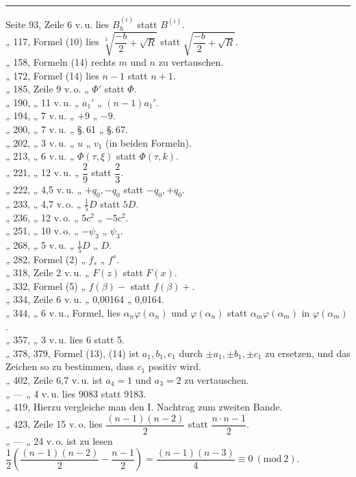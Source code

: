 \begin{center}
\textbf{}
\end{center}

\begin{center}
\rule{4cm}{0.4pt}
\end{center}

\begin{flushleft}
Seite 93, Zeile 6 v.\,u. lies $B_h^{(i)}$ statt $B^{(i)}$. \\
„ 117, Formel (10) lies $\sqrt[3]{\dfrac{-b}{2}+\sqrt{R}}$ statt $\sqrt{\dfrac{-b}{2}+\sqrt{R}}$. \\
„ 158, Formeln (14) rechts $m$ und $n$ zu vertauschen. \\
„ 172, Formel (14) lies $n-1$ statt $n+1$. \\
„ 185, Zeile 9 v.\,o. „ $\Phi'$ statt $\Phi$. \\
„ 190, „ 11 v.\,u. „ $a_1'$ „ $(n-1)a_1'$. \\
„ 194, „ 7 v.\,u. „ $+9$ „ $-9$. \\
„ 200, „ 7 v.\,u. „ \S.\,61 „ \S.\,67. \\
„ 202, „ 3 v.\,u. „ $u$ „ $v_1$ (in beiden Formeln). \\
„ 213, „ 6 v.\,u. „ $\Phi(\tau,\xi)$ statt $\Phi(\tau,k)$. \\
„ 221, „ 12 v.\,u. „ $\dfrac{2}{9}$ statt $\dfrac{2}{3}$. \\
„ 222, „ 4,5 v.\,u. „ $+q_0, -q_0$ statt $-q_0, +q_0$. \\
„ 233, „ 4,7 v.\,o. „ $\tfrac{1}{5}D$ statt $5D$. \\
„ 236, „ 12 v.\,o. „ $5c^2$ „ $-5c^2$. \\
„ 251, „ 10 v.\,o. „ $-\psi_3$ „ $\psi_3$. \\
„ 268, „ 5 v.\,u. „ $\tfrac{1}{5}D$ „ $D$. \\
„ 282, Formel (2) „ $f_s$ „ $f^s$. \\
„ 318, Zeile 2 v.\,u. „ $F(z)$ statt $F(x)$. \\
„ 332, Formel (5) „ $f(\beta)-$ statt $f(\beta)+$. \\
„ 334, Zeile 6 v.\,u. „ 0,00164 „ 0,0164. \\
„ 344, „ 6 v.\,u., Formel, lies $\alpha_n\varphi(\alpha_n)$ und $\varphi(\alpha_n)$ statt $\alpha_m\varphi(\alpha_m)$
in $\varphi(\alpha_m)$. \\
„ 357, „ 3 v.\,u. lies 6 statt 5. \\
„ 378, 379, Formel (13), (14) ist $a_1, b_1, c_1$ durch $\pm a_1, \pm b_1, \pm c_1$ zu
ersetzen, und das Zeichen so zu bestimmen, dass $c_1$ positiv wird. \\
„ 402, Zeile 6,7 v.\,u. ist $a_4=1$ und $a_3=2$ zu vertauschen. \\
„ — „ 4 v.\,u. lies 9083 statt 9183. \\
„ 419, Hierzu vergleiche man den I. Nachtrag zum zweiten Bande. \\
„ 423, Zeile 15 v.\,o. lies $\dfrac{(n-1)(n-2)}{2}$ statt $\dfrac{n\cdot n-1}{2}$. \\
„ — „ 24 v.\,o. ist zu lesen
$\dfrac{1}{2}\left(\dfrac{(n-1)(n-2)}{2}-\dfrac{n-1}{2}\right)
=\dfrac{(n-1)(n-3)}{4}\equiv 0\ (\mathrm{mod}\ 2)$.
\end{flushleft}

